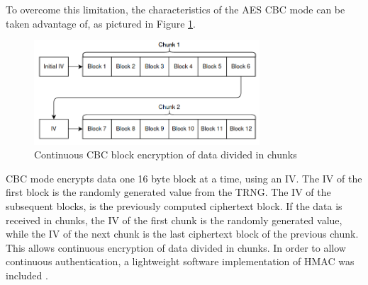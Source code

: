 To overcome this limitation, the characteristics of the AES CBC mode can be taken advantage of, as pictured in Figure \ref{fig:protocol:cbc-chunks}. 
\begin{figure}[h!]
	\centering
	\includegraphics[width=0.75\textwidth]{./Images/cbc-chunks.png}
	\caption{Continuous CBC block encryption of data divided in chunks}
	\label{fig:protocol:cbc-chunks}
\end{figure}
CBC mode encrypts data one 16 byte block at a time, using an IV. The IV of the first block is the randomly generated value from the TRNG. The IV of the subsequent blocks, is the previously computed ciphertext block.
If the data is received in chunks, the IV of the first chunk is the randomly generated value, while the IV of the next chunk is the last ciphertext block of the previous chunk.
This allows continuous encryption of data divided in chunks.
In order to allow continuous authentication, a lightweight software implementation of HMAC was included \cite{ogayHMAC}.

